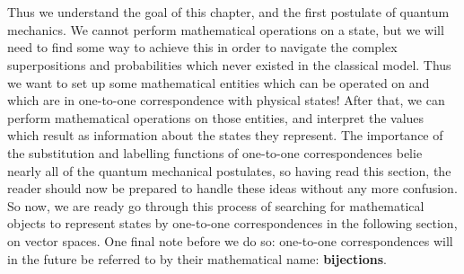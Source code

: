 \\\\
Thus we understand the goal of this chapter, and the first postulate of quantum mechanics. We cannot perform mathematical operations on a state, but we will need to find some way to achieve this in order to navigate the complex superpositions and probabilities which never existed in the classical model. Thus we want to set up some mathematical entities which can be operated on and which are in one-to-one correspondence with physical states! After that, we can perform mathematical operations on those entities, and interpret the values which result as information about the states they represent. The importance of the substitution and labelling functions of one-to-one correspondences belie nearly all of the quantum mechanical postulates, so having read this section, the reader should now be prepared to handle these ideas without any more confusion. So now, we are ready go through this process of searching for mathematical objects to represent states by one-to-one correspondences in the following section, on vector spaces. One final note before we do so: one-to-one correspondences will in the future be referred to by their mathematical name: \textbf{bijections}.
